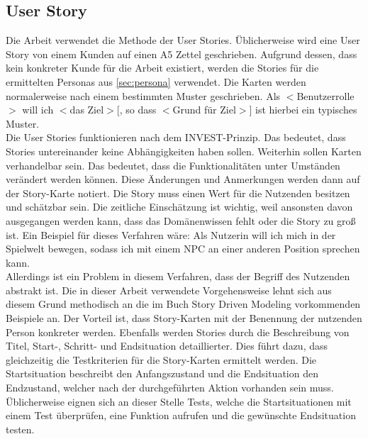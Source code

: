 \subsection{User Story}\label{sec:user-story}
Die Arbeit verwendet die Methode der User Stories\cite{scrum-user-stories}.
Üblicherweise wird eine User Story von einem Kunden auf einen A5 Zettel geschrieben. Aufgrund dessen, dass kein konkreter Kunde für die Arbeit existiert, werden die Stories für die ermittelten Personas aus \autoref{sec:persona} verwendet. Die Karten werden normalerweise nach einem bestimmten Muster geschrieben. \glqq Als $<$Benutzerrolle$>$ will ich $<$das Ziel$>$[, so dass $<$Grund für Ziel$>$]\grqq{} ist hierbei ein typisches Muster.\\

Die User Stories funktionieren nach dem \ac{INVEST}-Prinzip\cite{user-stories}. Das bedeutet, dass Stories untereinander keine Abhängigkeiten haben sollen. Weiterhin sollen Karten verhandelbar sein. Das bedeutet, dass die Funktionalitäten unter Umständen verändert werden können. Diese Änderungen und Anmerkungen werden dann auf der Story-Karte notiert. Die Story muss einen Wert für die Nutzenden besitzen und schätzbar sein. Die zeitliche Einschätzung ist wichtig, weil ansonsten davon ausgegangen werden kann, dass das Domänenwissen fehlt oder die Story zu groß ist. Ein Beispiel für dieses Verfahren wäre: \glqq Als Nutzerin will ich mich in der Spielwelt bewegen, sodass ich mit einem \ac{NPC} an einer anderen Position sprechen kann\grqq{}.\\

Allerdings ist ein Problem in diesem Verfahren, dass der Begriff des Nutzenden abstrakt ist. Die in dieser Arbeit verwendete Vorgehensweise lehnt sich aus diesem Grund methodisch an die im Buch Story Driven Modeling\cite{story-driven-modeling} vorkommenden Beispiele an. Der Vorteil ist, dass Story-Karten mit der Benennung der nutzenden Person konkreter werden. Ebenfalls werden Stories durch die Beschreibung von Titel, Start-, Schritt- und Endsituation detaillierter. Dies führt dazu, dass gleichzeitig die Testkriterien für die Story-Karten ermittelt werden. Die Startsituation beschreibt den Anfangszustand und die Endsituation den Endzustand, welcher nach der durchgeführten Aktion vorhanden sein muss. Üblicherweise eignen sich an dieser Stelle Tests, welche die Startsituationen mit einem Test überprüfen, eine Funktion aufrufen und die gewünschte Endsituation testen.\\

